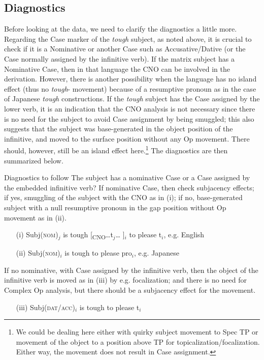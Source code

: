 \documentclass[output=paper]{langscibook}
\begin{document}
\subsection{Diagnostics} \label{s3.1ha}
Before looking at the data, we need to clarify the diagnostics a little more. Regarding the Case marker of the \textit{tough} subject, as noted above, it is crucial to check if it is a Nominative or another Case such as Accusative/Dative (or the Case normally assigned by the infinitive verb). If the matrix subject has a Nominative Case, then in that language the CNO can be involved in the derivation. However, there is another possibility when the language has no island effect (thus no \textit{tough}- movement) because of a resumptive pronoun as in the case of Japanese \textit{tough} constructions. If the \textit{tough} subject has the Case assigned by the lower verb, it is an indication that the CNO analysis is not necessary since there is no need for the subject to avoid Case assignment by being smuggled; this also suggests that the subject was base-generated in the object position of the infinitive, and moved to the surface position without any Op movement. There should, however, still be an island effect here.\footnote{We could be dealing here either with quirky subject movement to Spec TP or movement of the object to a position above TP for topicalization/focalization. Either way, the movement does not result in Case assignment.} The diagnostics are then summarized below.\largerpage[-1]\pagebreak

\begin{exe}
\ex \label{16ha}Diagnostics to follow
    \ea The subject has a nominative Case or a Case assigned by the embedded infinitive verb?
    \ex If nominative Case, then check subjacency effects; if yes, smuggling of the subject with the CNO as in (i); if no, base-generated subject with a null resumptive pronoun in the gap position without Op movement as in (ii).
    \begin{enumerate}
    \item[(i)] Subj(\textsc{nom})$_{j}$ is tough [\textsubscript{CNO}…t$_{j}$… ]$_{i}$ to please t$_{i}$, e.g. English
    \item[(ii)] Subj(\textsc{nom})$_{i}$ is tough to please pro$_{i}$, e.g. Japanese
    \end{enumerate}
    \ex If no nominative, with Case assigned by the infinitive verb, then the object of the infinitive verb is moved as in (iii) by e.g. focalization; and there is no need for Complex Op analysis, but there should be a subjacency effect for the movement.
    \begin{enumerate}
    \item[(iii)] Subj(\textsc{dat/acc})$_{i}$ is tough to please t$_{i}$                        
    \end{enumerate}
\z
\end{exe}
\end{document}
